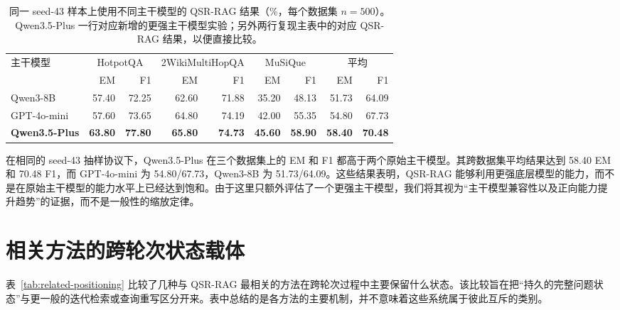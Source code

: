 \documentclass[11pt]{article}
\begin{document}
	\begin{table}[t]
		\centering
		\caption{同一 seed-43 样本上使用不同主干模型的 QSR-RAG 结果（\%，每个数据集 $n=500$）。Qwen3.5-Plus 一行对应新增的更强主干模型实验；另外两行复现主表中的对应 QSR-RAG 结果，以便直接比较。}
		\label{tab:stronger-backbone}
		\small
		\setlength{\tabcolsep}{4.0pt}
		\begin{tabular}{lrrrrrrrr}
			\toprule
			主干模型 & \multicolumn{2}{c}{HotpotQA} & \multicolumn{2}{c}{2WikiMultiHopQA} & \multicolumn{2}{c}{MuSiQue} & \multicolumn{2}{c}{平均}\\
			\cmidrule(lr){2-3}\cmidrule(lr){4-5}\cmidrule(lr){6-7}\cmidrule(lr){8-9}
			& EM & F1 & EM & F1 & EM & F1 & EM & F1\\
			\midrule
			Qwen3-8B      & 57.40 & 72.25 & 62.60 & 71.88 & 35.20 & 48.13 & 51.73 & 64.09\\
			GPT-4o-mini   & 57.60 & 73.65 & 64.80 & 74.19 & 42.00 & 55.35 & 54.80 & 67.73\\
			\textbf{Qwen3.5-Plus} & \textbf{63.80} & \textbf{77.80} & \textbf{65.80} & \textbf{74.73} & \textbf{45.60} & \textbf{58.90} & \textbf{58.40} & \textbf{70.48}\\
			\bottomrule
		\end{tabular}
	\end{table}

	在相同的 seed-43 抽样协议下，Qwen3.5-Plus 在三个数据集上的 EM 和 F1 都高于两个原始主干模型。其跨数据集平均结果达到 58.40 EM 和 70.48 F1，而 GPT-4o-mini 为 54.80/67.73，Qwen3-8B 为 51.73/64.09。这些结果表明，QSR-RAG 能够利用更强底层模型的能力，而不是在原始主干模型的能力水平上已经达到饱和。由于这里只额外评估了一个更强主干模型，我们将其视为“主干模型兼容性以及正向能力提升趋势”的证据，而不是一般性的缩放定律。

	\section{相关方法的跨轮次状态载体}
	\label{app:related-positioning}

	表~\ref{tab:related-positioning} 比较了几种与 QSR-RAG 最相关的方法在跨轮次过程中主要保留什么状态。该比较旨在把“持久的完整问题状态”与更一般的迭代检索或查询重写区分开来。表中总结的是各方法的主要机制，并不意味着这些系统属于彼此互斥的类别。
\end{document}
